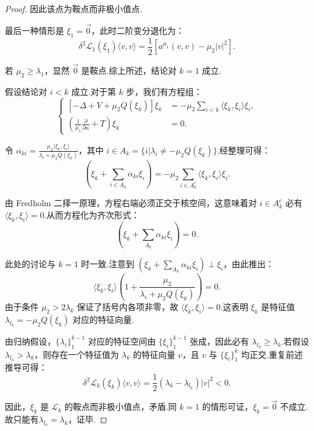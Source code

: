 \begin{proof}
因此该点为鞍点而非极小值点.

最后一种情形是 $\xi_{1}=\vec{0}$，此时二阶变分退化为：
\begin{equation*}
\delta^{2} \mathcal{L}_{1}(\xi_1)\langle v,v\rangle=\frac{1}{2}\left[a^{\mu_{1}}(v,v)-\mu_{2}|v|^{2}\right].
\end{equation*}

若 $\mu_{2}\geq \lambda_{1}$，显然 $\vec{0}$ 是鞍点.综上所述，结论对 $k=1$ 成立.

假设结论对 $i<k$ 成立.对于第 $k$ 步，我们有方程组：
$$\left\{
\begin{aligned}
\left[-\Delta + V + \mu_{2}Q(\xi_{k})\right]\xi_{k}&=-\mu_{2} \sum\limits_{i<k}\langle \xi_{k},\xi_{i}\rangle\xi_{i},\\
\left(\frac{1}{\mu_{1}} \frac{\partial}{\partial n}+T\right) \xi_{k}&=0.
\end{aligned}
\right.$$

令 $\alpha_{ki}=\frac{\mu_{2}\langle \xi_{k},\xi_{i} \rangle}{\lambda_{i}+\mu_{2}Q(\xi_{k})}$，其中 $i\in A_{k}=\{i|\lambda_{i}\neq -\mu_{2}Q(\xi_{k})\}$.经整理可得：
\begin{equation*}
[-\Delta + V + \mu_{2}Q(\xi_{k})]\left(\xi_{k}+\sum_{i\in A_{k}}\alpha_{ki}\xi_{i}\right)=-\mu_{2}\sum_{i\in A_{k}^{c}}\langle \xi_{k},\xi_{i}\rangle\xi_{i}.
\end{equation*}

由 Fredholm 二择一原理，方程右端必须正交于核空间，这意味着对 $i\in A_{k}^{c}$ 必有 $\langle \xi_{k},\xi_{i}\rangle=0$.从而方程化为齐次形式：
\begin{equation*}
[-\Delta + V + \mu_{2}Q(\xi_{k})]\left(\xi_{k}+\sum_{A_{k}}\alpha_{ki}\xi_{i}\right)=0.
\end{equation*}

此处的讨论与 $k=1$ 时一致.注意到 $\left(\xi_{k}+\sum_{A_{k}} \alpha_{k i} \xi_{i}\right) \perp \xi_{i}$，由此推出：
\begin{equation*}
\langle \xi_{k},\xi_{i} \rangle\left(1+\frac{\mu_{2}}{\lambda_{i}+\mu_{2}Q(\xi_{k})}\right)=0.
\end{equation*}
由于条件 $\mu_{2}>2\lambda_{k}$ 保证了括号内各项非零，故 $\langle \xi_{k},\xi_{i}\rangle=0$.这表明 $\xi_{k}$ 是特征值 $\lambda_{l_{k}}=-\mu_{2}Q(\xi_{k})$ 对应的特征向量.

由归纳假设，$\{\lambda_{i}\}_{1}^{k-1}$ 对应的特征空间由 $\{\xi_{i}\}_{1}^{k-1}$ 张成，因此必有 $\lambda_{l_{k}}\geq \lambda_{k}$.若假设 $\lambda_{l_{k}}>\lambda_{k}$，则存在一个特征值为 $\lambda_{k}$ 的特征向量 $v$，且 $v$ 与 $\{\xi_{i}\}_{1}^{k}$ 均正交.重复前述推导可得：
$$\delta^{2} \mathcal{L}_{k}(\xi_k)\langle v,v\rangle=\frac{1}{2}(\lambda_{k}-\lambda_{l_k})|v|^{2}<0.$$

因此，$\xi_k$ 是 $\mathcal{L}_{k}$ 的鞍点而非极小值点，矛盾.同 $k=1$ 的情形可证，$\xi_{k}=\vec{0}$ 不成立.故只能有$\lambda_{l_{k}}= \lambda_{k}$，证毕.
\end{proof}


